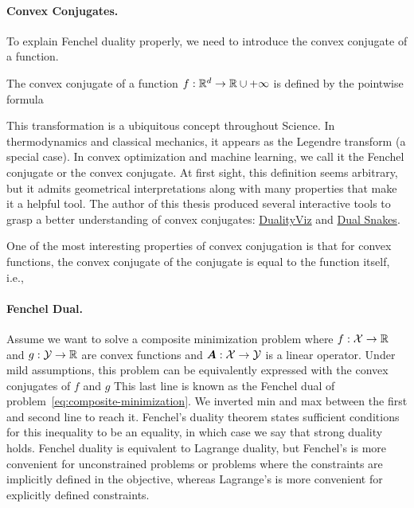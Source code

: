 \paragraph{Convex Conjugates.}
To explain Fenchel duality properly, we need to introduce the convex conjugate of a function.
\begin{definition}
	The convex conjugate of a function $f:\mathbb{R}^d \rightarrow \mathbb{R}\cup{+\infty}$ is defined by the pointwise formula
\end{definition}
This transformation is a ubiquitous concept throughout Science.
In thermodynamics and classical mechanics, it appears as the Legendre transform (a special case). In convex optimization and machine learning, we call it the Fenchel conjugate or the convex conjugate.
At first sight, this definition seems arbitrary, but it admits geometrical interpretations along with many properties that make it a helpful tool.
The author of this thesis produced several interactive tools to grasp a better understanding of convex conjugates: \href{https://remilepriol.github.io/dualityviz/}{DualityViz} and \href{https://remilepriol.github.io/dualityviz/dual_snakes.html}{Dual Snakes}.

One of the most interesting properties of convex conjugation is that for convex functions, the convex conjugate of the conjugate is equal to the function itself, i.e.,

\paragraph{Fenchel Dual.}
Assume we want to solve a composite minimization problem
where $f:{\mathcal X} \rightarrow\mathbb{R}$ and $g:{\mathcal Y} \rightarrow \mathbb{R}$ are convex functions and ${\bm{A}}: {\mathcal X} \rightarrow {\mathcal Y}$ is a linear operator.
Under mild assumptions, this problem can be equivalently expressed with the convex conjugates of $f$ and $g$
This last line is known as the Fenchel dual of problem~\eqref{eq:composite-minimization}.
We inverted min and max between the first and second line to reach it.
Fenchel's duality theorem states sufficient conditions for this inequality to be an equality, in which case we say that strong duality holds.
Fenchel duality is equivalent to Lagrange duality, but Fenchel's is more convenient for unconstrained problems or problems where the constraints are implicitly defined in the objective, whereas Lagrange's is more convenient for explicitly defined constraints.

